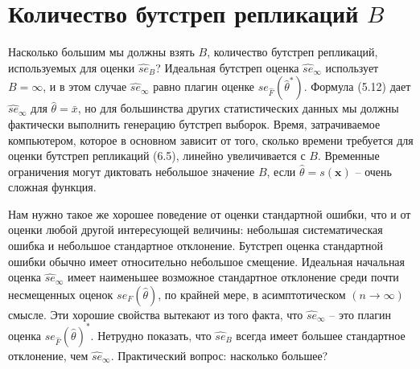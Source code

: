 \section{Количество бутстреп репликаций $B$}

Насколько большим мы должны взять $B$, количество бутстреп репликаций, используемых для оценки $\widehat{se}_B$? Идеальная бутстреп оценка $\widehat{se}_\infty$ использует $B=\infty$, и в этом случае $\widehat{se}_\infty$ равно плагин оценке $se_{\hat F}(\hat\theta^*)$. Формула (5.12) дает $\widehat{se}_\infty$ для $\hat\theta=\bar x$, но для большинства других статистических данных мы должны фактически выполнить генерацию бутстреп выборок. Время, затрачиваемое компьютером, которое в основном зависит от того, сколько времени требуется для оценки бутстреп репликаций (6.5), линейно увеличивается с $B$. Временные ограничения могут диктовать небольшое значение $B$, если $\hat\theta = s (\mathbf{x})$ -- очень сложная функция.

Нам нужно такое же хорошее поведение от оценки стандартной ошибки, что и от оценки любой другой интересующей величины: небольшая систематическая ошибка и небольшое стандартное отклонение. Бутстреп оценка стандартной ошибки обычно имеет относительно небольшое смещение. Идеальная начальная оценка $\widehat{se}_\infty$ имеет наименьшее возможное стандартное отклонение среди почти несмещенных оценок $se_F(\hat\theta)$, по крайней мере, в асимптотическом $(n \rightarrow\infty)$ смысле. Эти хорошие свойства вытекают из того факта, что $\widehat{se}_\infty$ -- это плагин оценка $se_{\hat F}(\hat\theta)^*$. Нетрудно показать, что $\widehat{se}_B$ всегда имеет большее стандартное отклонение, чем $\widehat{se}_\infty$. Практический вопрос: насколько большее?

